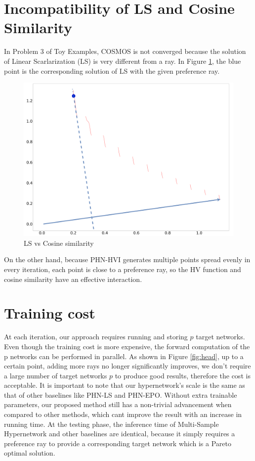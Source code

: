 \documentclass[letterpaper]{article} %
\newcommand{\ourmodel}{PHN-HVI }
\begin{document}
\section{Incompatibility of LS and Cosine Similarity }
In Problem 3 of Toy Examples, COSMOS is not converged because the solution of Linear Scarlarization (LS) is very different from a ray. In Figure \ref{fig:ls_cs}, the blue point is the corresponding solution of LS with the given preference ray.
\begin{figure}[!htb]
    \centering
    \includegraphics[width = .65\columnwidth]{figures/ls_vs_cosine.drawio.pdf}
    \caption{LS vs Cosine similarity}
    \label{fig:ls_cs}
\end{figure}

On the other hand, because \ourmodel generates multiple points spread evenly in every iteration, each point is close to a preference ray, so the HV function and cosine similarity have an effective interaction.


\section{Training cost}
At each iteration, our approach requires running and storing $p$ target networks. Even though the training cost is more expensive, the forward computation of the p networks can be performed in parallel. As shown in Figure \ref{fig:head}, up to a certain point, adding more rays no longer significantly improves, we don't require a large number of target networks $p$ to produce good results, therefore the cost is acceptable. It is important to note that our hypernetwork's scale is the same as that of other baselines like PHN-LS and PHN-EPO. Without extra trainable parameters, our proposed method still has a non-trivial advancement when compared to other methods, which cant improve the result with an increase in running time. At the testing phase, the inference time of Multi-Sample Hypernetwork and other baselines are identical, because it simply requires a preference ray to provide a corresponding target network which is a Pareto optimal solution.
\end{document}
